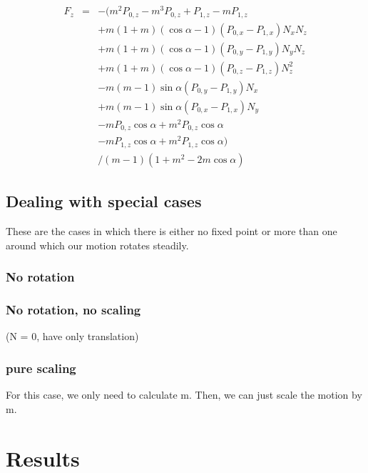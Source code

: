 \documentclass[journal, letterpaper]{IEEEtran}
\begin{document}
\begin{equation}
\begin{array}{lcl}
 F_z &=& -(m^2 P_{0,z} - m^3 P_{0,z} + P_{1,z} - m P_{1,z} \\
		&& + m (1+m) (\cos\alpha - 1) (P_{0,x} - P_{1,x}) N_x N_z \\
		&& + m (1+m) (\cos\alpha - 1) (P_{0,y} - P_{1,y}) N_y N_z \\
		&& + m (1+m) (\cos\alpha - 1) (P_{0,z} - P_{1,z}) N_z^2 \\
		&& - m (m-1) \sin\alpha (P_{0,y} - P_{1,y}) N_x \\
		&& + m (m-1) \sin\alpha (P_{0,x} - P_{1,x}) N_y \\
		&& - m P_{0,z} \cos\alpha + m^2 P_{0,z} \cos\alpha \\
		&& - m P_{1,z} \cos\alpha + m^2 P_{1,z} \cos\alpha) \\
		&& / (m-1)(1 + m^2 - 2m\cos\alpha)
\end{array}
\label{eq:}
\end{equation}


\subsection{Dealing with special cases}
These are the cases in which there is either no fixed point or more than one around which our motion rotates steadily.

\subsubsection{No rotation}\label{NoRot}

\subsubsection{No rotation, no scaling}
(N = 0, have only translation)

\subsubsection{pure scaling}
For this case, we only need to calculate m.  Then, we can just scale the motion by m.

\section{Results}
\end{document}
